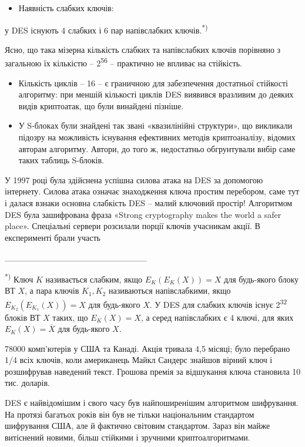 \documentclass[a4paper]{article}
\newcommand\liststyleWWviiiNumxlix{%
\renewcommand\labelitemi{\textlatin{[F0B7?]}}
\renewcommand\labelitemii{o}
\renewcommand\labelitemiii{\textlatin{[F0A7?]}}
\renewcommand\labelitemiv{\textlatin{[F0B7?]}}
}
\newcounter{}
\begin{document}
\liststyleWWviiiNumxlix
\begin{itemize}
\item Наявність слабких ключів:
\end{itemize}
 у DES існують 4 слабких і 6 пар напівслабких ключів.\textsuperscript{*)}

Ясно, що така мізерна кількість слабких та напівслабких ключів порівняно з
загальною їх кількістю – 2\textsuperscript{56} – практично не впливає на
стійкість. 

\liststyleWWviiiNumxlix
\begin{itemize}
\item Кількість циклів – 16 – є граничною для забезпечення достатньої стійкості
алгоритму: при меншій кількості циклів DES виявився вразливим до деяких видів
криптоатак, що були винайдені пізніше.  
\item У S-блоках були знайдені так звані «квазилінійні структури», що викликали
підозру на можливість існування ефективних методів криптоаналізу, відомих
авторам алгоритму. Автори, до того ж, недостатньо обгрунтували вибір саме таких
таблиць S-блоків.
\end{itemize}

\bigskip

У 1997 році була здійснена успішна силова атака на DES за допомогою інтернету.
Силова атака означає знаходження ключа простим перебором, саме тут і далася
взнаки основна слабкість DES – малий ключовий простір! Алгоритмом DES\textit{
}була зашифрована фраза «Strong cryptography makes the world a safer place».
Спеціальні сервери розсилали порції ключів учасникам акції. В експерименті
брали участь 

\_\_\_\_\_\_\_\_\_\_\_\_\_\_\_\_\_\_\_\_\_\_\_

\textsuperscript{*) }Ключ  ${K}$ називається слабким, якщо 
${E_{{K}}(E_{{K}}(X))=X}$ для будь-якого блоку ВТ  ${X}$, а пара ключів 
${K_{{1}},K_{{2}}}$ називаються напівслабкими, якщо 
${E_{{K}_{{2}}}(E_{{K}_{{1}}}(X))=X}$ для будь-якого  ${X}$. У DES для слабких
ключів існує 2\textsuperscript{32}  блоків ВТ  ${X}$ таких, що 
${E_{{K}}(X)=X}$, а серед напівслабких є 4 ключі, для яких 
${E_{{K}}(X)=\overline{{X}}}$ для будь-якого  ${X}$. 

78000 комп’ютерів у США та Канаді. Акція тривала 4,5 місяці; було перебрано 1/4
всіх ключів, коли американець Майкл Сандерс знайшов вірний ключ і розшифрував
наведений текст. Грошова премія за відшукання ключа становила 10 тис. доларів.

DES є найвідомішим і свого часу був найпоширенішим алгоритмом шифрування. На
протязі багатьох років він був не тільки національним стандартом шифрування
США, але й фактично світовим стандартом. Зараз він майже витіснений новими,
більш стійкими і зручними криптоалгоритмами.
\end{document}

